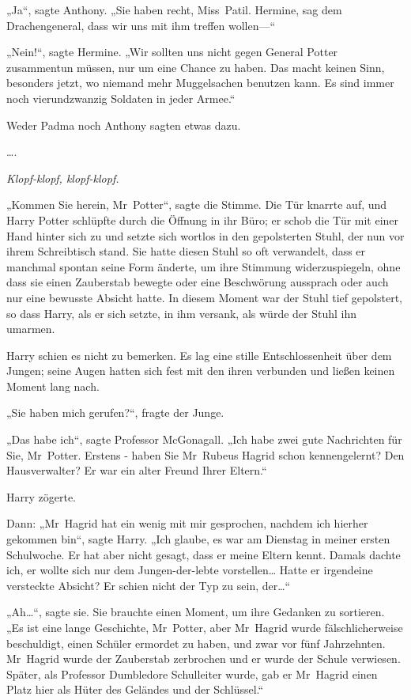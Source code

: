 {„Ja“, sagte Anthony. „Sie haben recht, Miss~Patil. Hermine, sag dem Drachengeneral, dass wir uns mit ihm treffen wollen—“

„Nein!“, sagte Hermine. „Wir sollten uns nicht gegen General Potter zusammentun müssen, nur um eine Chance zu haben. Das macht keinen Sinn, besonders jetzt, wo niemand mehr Muggelsachen benutzen kann. Es sind immer noch vierundzwanzig Soldaten in jeder Armee.“

Weder Padma noch Anthony sagten etwas dazu.

….

\emph{Klopf-klopf, klopf-klopf.}

„Kommen Sie herein, Mr~Potter“, sagte die Stimme. Die Tür knarrte auf, und Harry Potter schlüpfte durch die Öffnung in ihr Büro; er schob die Tür mit einer Hand hinter sich zu und setzte sich wortlos in den gepolsterten Stuhl, der nun vor ihrem Schreibtisch stand. Sie hatte diesen Stuhl so oft verwandelt, dass er manchmal spontan seine Form änderte, um ihre Stimmung widerzuspiegeln, ohne dass sie einen Zauberstab bewegte oder eine Beschwörung aussprach oder auch nur eine bewusste Absicht hatte. In diesem Moment war der Stuhl tief gepolstert, so dass Harry, als er sich setzte, in ihm versank, als würde der Stuhl ihn umarmen.

Harry schien es nicht zu bemerken. Es lag eine stille Entschlossenheit über dem Jungen; seine Augen hatten sich fest mit den ihren verbunden und ließen keinen Moment lang nach.

„Sie haben mich gerufen?“, fragte der Junge.

„Das habe ich“, sagte Professor McGonagall. „Ich habe zwei gute Nachrichten für Sie, Mr~Potter. Erstens - haben Sie Mr~Rubeus Hagrid schon kennengelernt? Den Hausverwalter? Er war ein alter Freund Ihrer Eltern.“

Harry zögerte.

Dann: „Mr~Hagrid hat ein wenig mit mir gesprochen, nachdem ich hierher gekommen bin“, sagte Harry. „Ich glaube, es war am Dienstag in meiner ersten Schulwoche. Er hat aber nicht gesagt, dass er meine Eltern kennt. Damals dachte ich, er wollte sich nur dem Jungen-der-lebte vorstellen… Hatte er irgendeine versteckte Absicht? Er schien nicht der Typ zu sein, der…“

„Ah…“, sagte sie. Sie brauchte einen Moment, um ihre Gedanken zu sortieren. „Es ist eine lange Geschichte, Mr~Potter, aber Mr~Hagrid wurde fälschlicherweise beschuldigt, einen Schüler ermordet zu haben, und zwar vor fünf Jahrzehnten. Mr~Hagrid wurde der Zauberstab zerbrochen und er wurde der Schule verwiesen. Später, als Professor Dumbledore Schulleiter wurde, gab er Mr~Hagrid einen Platz hier als Hüter des Geländes und der Schlüssel.“

}
